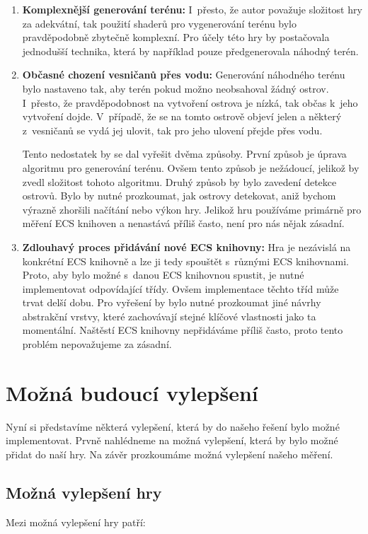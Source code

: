 \begin{enumerate}
    \item \textbf{Komplexnější generování terénu:} I~přesto, že autor považuje složitost hry za adekvátní, tak použití shaderů pro vygenerování terénu bylo pravděpodobně zbytečně komplexní. Pro účely této hry by postačovala jednodušší technika, která by například pouze předgenerovala náhodný terén.

    \item \textbf{Občasné chození vesničanů přes vodu:} Generování náhodného terénu bylo nastaveno tak, aby terén pokud možno neobsahoval žádný ostrov. I~přesto, že pravděpodobnost na vytvoření ostrova je nízká, tak občas k~jeho vytvoření dojde. V~případě, že se na tomto ostrově objeví jelen a některý z~vesničanů se vydá jej ulovit, tak pro jeho ulovení přejde přes vodu.
    
    Tento nedostatek by se dal vyřešit dvěma způsoby. První způsob je úprava algoritmu pro generování terénu. Ovšem tento způsob je nežádoucí, jelikož by zvedl složitost tohoto algoritmu. Druhý způsob by bylo zavedení detekce ostrovů. Bylo by nutné prozkoumat, jak ostrovy detekovat, aniž bychom výrazně zhoršili načítání nebo výkon hry. Jelikož hru používáme primárně pro měření ECS knihoven a nenastává příliš často, není pro nás nějak zásadní.

    \item \textbf{Zdlouhavý proces přidávání nové ECS knihovny:} Hra je nezávislá na konkrétní ECS knihovně a lze ji tedy spouštět s~různými ECS knihovnami. Proto, aby bylo možné s~danou ECS knihovnou spustit, je nutné implementovat odpovídající třídy. Ovšem implementace těchto tříd může trvat delší dobu. Pro vyřešení by bylo nutné prozkoumat jiné návrhy abstrakční vrstvy, které zachovávají stejné klíčové vlastnosti jako ta momentální. Naštěstí ECS knihovny nepřidáváme příliš často, proto tento problém nepovažujeme za zásadní.
\end{enumerate}

\section{Možná budoucí vylepšení}
Nyní si představíme některá vylepšení, která by do našeho řešení bylo možné implementovat. Prvně nahlédneme na možná vylepšení, která by bylo možné přidat do naší hry. Na závěr prozkoumáme možná vylepšení našeho měření.

\subsection{Možná vylepšení hry}
Mezi možná vylepšení hry patří:

